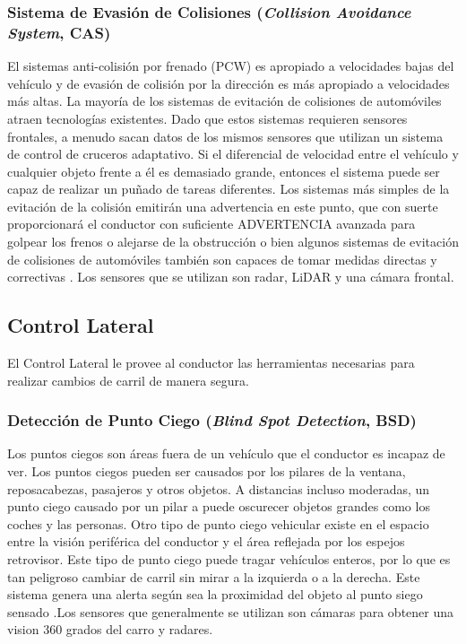 \subsubsection{Sistema de Evasión de Colisiones {\footnotesize(\textit{Collision Avoidance System}, CAS)} }

El sistemas anti-colisión por frenado (PCW) es apropiado a velocidades bajas del vehículo y de evasión de colisión por la dirección es más apropiado a velocidades más altas. La mayoría de los sistemas de evitación de colisiones de automóviles atraen tecnologías existentes. Dado que estos sistemas requieren sensores frontales, a menudo sacan datos de los mismos sensores que utilizan un sistema de control de cruceros adaptativo. Si el diferencial de velocidad entre el vehículo y cualquier objeto frente a él es demasiado grande, entonces el sistema puede ser capaz de realizar un puñado de tareas diferentes. Los sistemas más simples de la evitación de la colisión emitirán una advertencia en este punto, que con suerte proporcionará el conductor con suficiente ADVERTENCIA avanzada para golpear los frenos o alejarse de la obstrucción o bien algunos sistemas de evitación de colisiones de automóviles también son capaces de tomar medidas directas y correctivas \cite{PintoNeto2016}. Los sensores que se utilizan son radar, LiDAR y una cámara frontal. 

\newpage

\subsection{Control Lateral}

El Control Lateral le provee al conductor las herramientas necesarias para realizar cambios de carril de manera segura. 

\subsubsection{Detección de Punto Ciego {\footnotesize(\textit{Blind Spot Detection}, BSD)}}

Los puntos ciegos son áreas fuera de un vehículo que el conductor es incapaz de ver. Los puntos ciegos pueden ser causados por los pilares de la ventana, reposacabezas, pasajeros y otros objetos. A distancias incluso moderadas, un punto ciego causado por un pilar a puede oscurecer objetos grandes como los coches y las personas. Otro tipo de punto ciego vehicular existe en el espacio entre la visión periférica del conductor y el área reflejada por los espejos retrovisor. Este tipo de punto ciego puede tragar vehículos enteros, por lo que es tan peligroso cambiar de carril sin mirar a la izquierda o a la derecha. Este sistema genera una alerta según sea la proximidad del objeto al punto siego sensado \cite{Thakur2016}.Los sensores que generalmente se utilizan son cámaras para obtener una vision 360 grados del carro y radares. 

